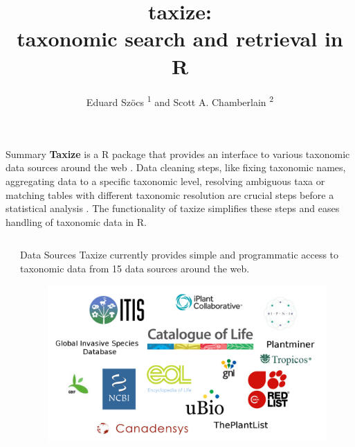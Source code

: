 \documentclass[final,t]{beamer}\usepackage[]{graphicx}\usepackage[]{color}
\title{taxize: \\[0.2em] taxonomic search and retrieval in R}
\author{Eduard Szöcs \textsuperscript{1} and Scott A. Chamberlain \textsuperscript{2}}
\institute{\textsuperscript{1} University of Koblenz-Landau, \textsuperscript{2} rOpenSci}
\begin{document}
  \begin{frame}[fragile]

		\begin{block}{\Large Summary}
    \Large \textcolor{i6bluedark}{\textbf{Taxize}} is a R package that provides an interface to various taxonomic data sources around the web \cite{chamberlain_taxize:_2013}.
    Data cleaning steps, like fixing taxonomic names, aggregating data to a specific taxonomic level, resolving ambiguous taxa or matching tables with different taxonomic resolution are crucial steps before a statistical analysis \cite{boyle_taxonomic_2013}. 
    The functionality of taxize simplifies these steps and eases handling of taxonomic data in R. 
		\end{block}
    \vspace{.5em}

	\begin{columns}[t]
		\begin{column}{0.01\linewidth}
		\end{column}

		\begin{column}{.485\linewidth}
			\vspace{-\baselineskip}  %
			\begin{block}{Data Sources}
        Taxize currently provides simple and programmatic access to taxonomic data from 15 data sources around the web.
        \vspace{0.5cm}
				\begin{figure}
					\includegraphics[width=0.9\linewidth]{fig/sources.png}
					\label{fig:sources}
				\end{figure}
			\end{block}


\end{column}
\end{columns}
\end{frame}
\end{document}
